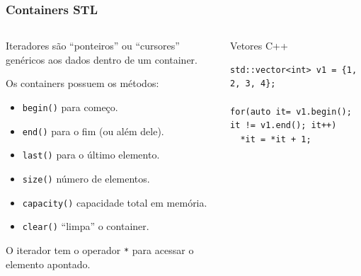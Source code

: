 \documentclass[xcolor={usenames,dvipsnames},10pt,presentation,aspectratio=169]{beamer}
\begin{document}
\begin{frame}[fragile]
  \frametitle{Containers STL}
  \vspace{-2mm}
    \begin{columns}
      \begin{column}{0.5\textwidth}
        Iteradores são ``ponteiros'' ou ``cursores'' genéricos aos dados dentro de um container.

        Os containers possuem os métodos:
        \begin{itemize}
           \item \texttt{begin()} para começo.
           \item \texttt{end()} para o fim (ou além dele). 
           \item \texttt{last()} para o último elemento.
          \item \texttt{size()} número de elementos.
          \item \texttt{capacity()} capacidade total em memória.
          \item \texttt{clear()} ``limpa'' o container.
        \end{itemize}
        O iterador tem o operador \texttt{*} para acessar o elemento apontado.
     \end{column}
      \begin{column}{0.5\textwidth}
\begin{block}{Vetores C++}
\begin{lstlisting}
std::vector<int> v1 = {1, 2, 3, 4};

for(auto it= v1.begin(); it != v1.end(); it++)
  *it = *it + 1;
\end{lstlisting}
\end{block}
      \end{column}
    \end{columns}
\end{frame}
\end{document}
